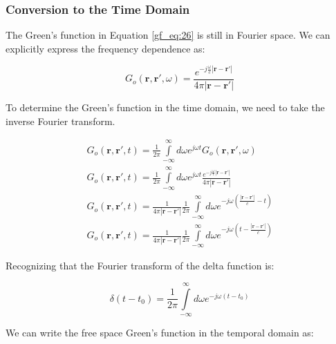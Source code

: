 \subsubsection {Conversion to the Time Domain}
The Green's function in Equation \ref{gf_eq:26} is still in Fourier space. We can explicitly express the frequency dependence as:

\begin{equation}
G_o\left(\mathbf{r},\mathbf{r}',\omega\right) = \frac{e^{-j\frac{\omega}{c}|\mathbf{r} - \mathbf{r}'|}}{4\pi |\mathbf{r} - \mathbf{r}'|}
\label{gf_eq:28}
\end{equation}
\renewcommand{\baselinestretch}{2} \small\normalsize

\noindent To determine the Green's function in the time domain, we need to take the inverse Fourier transform.

\begin{equation}
\begin{gathered}
G_o\left(\mathbf{r},\mathbf{r}',t\right) = \frac{1}{2\pi}\int\limits_{-\infty}^{\infty}d\omega e^{j\omega t}G_o\left(\mathbf{r},\mathbf{r}',\omega\right) \\
G_o\left(\mathbf{r},\mathbf{r}',t\right) = \frac{1}{2\pi}\int\limits_{-\infty}^{\infty}d\omega e^{j\omega t}  \frac{e^{-j\frac{\omega}{c}|\mathbf{r}-\mathbf{r}'|}}{4\pi |\mathbf{r}-\mathbf{r}'|}\\
G_o\left(\mathbf{r},\mathbf{r}',t\right) = \frac{1}{4\pi |\mathbf{r}-\mathbf{r}'|}\frac{1}{2\pi}\int\limits_{-\infty}^{\infty}d\omega e^{-j\omega\left(\frac{|\mathbf{r}-\mathbf{r}'|}{c} - t\right)} \\
G_o\left(\mathbf{r},\mathbf{r}',t\right) = \frac{1}{4\pi |\mathbf{r}-\mathbf{r}'|}\frac{1}{2\pi}\int\limits_{-\infty}^{\infty}d\omega e^{-j\omega\left(t - \frac{|\mathbf{r}-\mathbf{r}'|}{c}\right)}
\end{gathered}
\label{gf_eq:29}
\end{equation}
\renewcommand{\baselinestretch}{2} \small\normalsize

\noindent Recognizing that the Fourier transform of the delta function is:

\begin{equation}
\delta(t-t_0) = \frac{1}{2\pi}\int\limits_{-\infty}^{\infty}d\omega e^{-j\omega \left(t-t_0\right)}
\label{gf_eq:30}
\end{equation}
\renewcommand{\baselinestretch}{2} \small\normalsize

\noindent We can write the free space Green's function in the temporal domain as:


